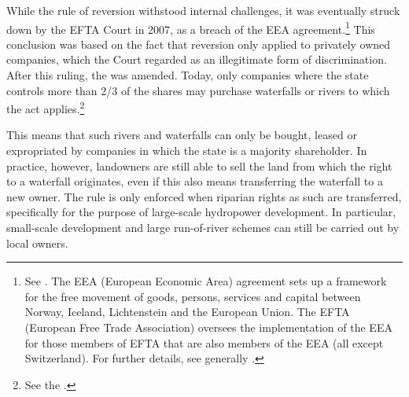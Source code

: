 While the rule of reversion withstood internal challenges, it was eventually struck down by the EFTA Court in 2007, as a breach of the EEA agreement.\footnote{See \cite{efta07}. The EEA (European Economic Area) agreement sets up a framework for the free movement of goods, persons, services and capital between Norway, Iceland, Lichtenstein and the European Union. The EFTA (European Free Trade Association) oversees the implementation of the EEA for those members of EFTA that are also members of the EEA (all except Switzerland). For further details, see generally \cite{bull94,magnussen02,fredriksen09}.} This conclusion was based on the fact that reversion only applied to privately owned companies, which the Court regarded as an illegitimate form of discrimination. After this ruling, the \cite{ica17} was amended. Today, only companies where the state controls more than 2/3 of the shares may purchase waterfalls or rivers to which the act applies.\footnote{See the \cite[2]{ica17}.}

This means that such rivers and waterfalls can only be bought, leased or expropriated by companies in which the state is a majority shareholder. In practice, however, landowners are still able to sell the land from which the right to a waterfall originates, even if this also means transferring the waterfall to a new owner. The rule is only enforced when riparian rights as such are transferred, specifically for the purpose of large-scale hydropower development. In particular, small-scale development and large run-of-river schemes can still be carried out by local owners. %

